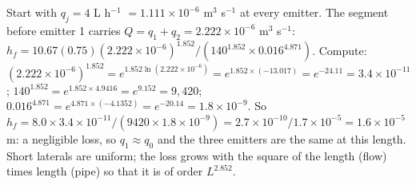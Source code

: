 \sol  Start with $q_j=4$ L h$^{-1}$ $=1.111\times10^{-6}$ m$^3$ s$^{-1}$ at every emitter. The segment before emitter 1 carries $Q=q_1+q_2=2.222\times10^{-6}$ m$^3$ s$^{-1}$: $h_f=10.67(0.75)(2.222\times10^{-6})^{1.852}/(140^{1.852}\times0.016^{4.871})$. Compute: $(2.222\times10^{-6})^{1.852}=e^{1.852\ln(2.222\times10^{-6})}=e^{1.852\times(-13.017)}=e^{-24.11}=3.4\times10^{-11}$; $140^{1.852}=e^{1.852\times4.9416}=e^{9.152}=9{,}420$; $0.016^{4.871}=e^{4.871\times(-4.1352)}=e^{-20.14}=1.8\times10^{-9}$. So $h_f=8.0\times3.4\times10^{-11}/(9420\times1.8\times10^{-9})=2.7\times10^{-10}/1.7\times10^{-5}=1.6\times10^{-5}$ m: a negligible loss, so $q_1\approx q_0$ and the three emitters are the same at this length. Short laterals are uniform; the loss grows with the square of the length (flow) times length (pipe) so that it is of order $L^{2.852}$.


